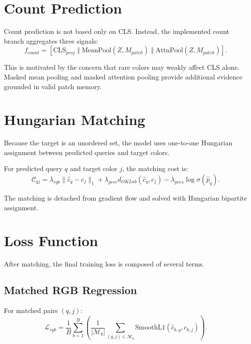 \documentclass[11pt,a4paper]{article}
\begin{document}
\section{Count Prediction}

Count prediction is not based only on CLS. Instead, the implemented count branch aggregates three signals:
\begin{equation}
f_{count} = \left[
\text{CLS}_{proj}
\; \Vert \;
\text{MeanPool}(Z, M_{patch})
\; \Vert \;
\text{AttnPool}(Z, M_{patch})
\right].
\end{equation}

This is motivated by the concern that rare colors may weakly affect CLS alone. Masked mean pooling and masked attention pooling provide additional evidence grounded in valid patch memory.

\section{Hungarian Matching}

Because the target is an unordered set, the model uses one-to-one Hungarian assignment between predicted queries and target colors.

For predicted query $q$ and target color $j$, the matching cost is:
\begin{equation}
\mathcal{C}_{qj}
=
\lambda_{rgb} \| \hat{c}_q - c_j \|_1
+
\lambda_{perc} d_{OKLab}(\hat{c}_q, c_j)
-
\lambda_{pres} \log \sigma(\hat{p}_q).
\end{equation}

The matching is detached from gradient flow and solved with Hungarian bipartite assignment.

\section{Loss Function}

After matching, the final training loss is composed of several terms.

\subsection{Matched RGB Regression}

For matched pairs $(q,j)$:
\begin{equation}
\mathcal{L}_{rgb}
=
\frac{1}{B}
\sum_{b=1}^{B}
\left(
\frac{1}{|\mathcal{M}_b|}
\sum_{(q,j)\in\mathcal{M}_b}
\text{SmoothL1}(\hat{c}_{b,q}, c_{b,j})
\right).
\end{equation}
\end{document}

